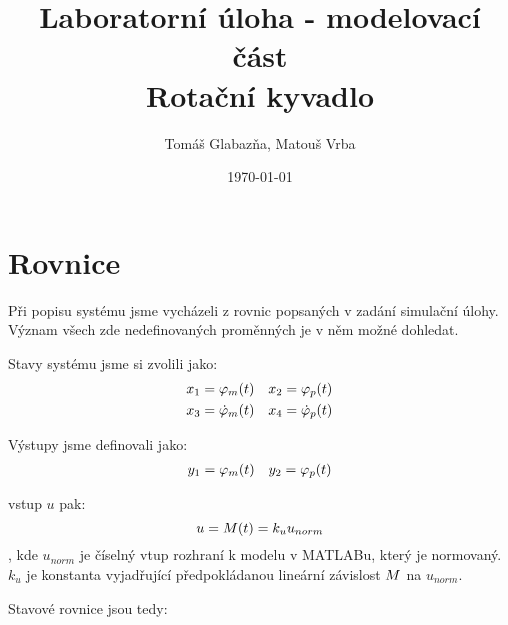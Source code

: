 \documentclass[11pt,a4paper]{article}
\title{%
  Laboratorní úloha - modelovací část\\
  \large Rotační kyvadlo}
\author{Tomáš Glabazňa, Matouš Vrba}
\date{\today}
\begin{document}
\maketitle

\clearpage

\section{Rovnice}
\renewcommand{\u}{u}
\newcommand{\x}[2][]{ %
  \ifstrequal{#1}{t} %
   	{x_{#2}(t)} %
    {x_{#2}}    %
}
\newcommand{\xd}[2][]{
  \ifstrequal{#1}{t} 
   	{\dot{x}_{#2}(t)}
    {\dot{x}_{#2}}
}
\newcommand{\y}[1]{y_{#1}}
\newcommand{\M}[1][]{
	\ifstrequal{#1}{t}
	{M(t)}
	{M}
}
\newcommand{\ku}{k_{u}}
\newcommand{\un}{u_{norm}}
\newcommand{\phid}[2][]{
	\ifstrequal{#1}{t}
	{\dot{\varphi}_{#2}(t)}
	{\dot{\varphi}_{#2}}
	}
\newcommand{\phidd}[1]{\ddot{\varphi}_{#1}}
\newcommand{\phin}[2][]{ %
	\ifstrequal{#1}{t}	
	{\varphi_{#2}(t)}
	{\varphi_{#2}}
	}
\newcommand{\coss}[1]{\cos{(#1)}}
\newcommand{\sinn}[1]{\sin{(#1)}}
\newcommand{\sinnN}[1]{\sin^2{(#1)}} %

Při popisu systému jsme vycházeli z rovnic popsaných v zadání simulační úlohy. Význam všech zde nedefinovaných proměnných je v něm možné dohledat.

Stavy systému jsme si zvolili jako:
\begin{align*}
& \x{1} = \phin[t]{m}		 && 		\x{2} = \phin[t]{p} \\
& \x{3} = \phid[t]{m}		 &&		\x{4} = \phid[t]{p} \\
\end{align*}

Výstupy jsme definovali jako:
\begin{align*}
& \y{1} = \phin[t]{m}		 &&		\y{2} = \phin[t]{p} \\
\end{align*}

vstup $\u$ pak:
$$
\u = \M[t] = \ku \un
$$
, kde $\un$ je číselný vtup rozhraní k modelu v MATLABu, který je normovaný. $k_u$ je konstanta vyjadřující předpokládanou lineární závislost $\M$ na $\un$.

Stavové rovnice jsou tedy:
\end{document}
